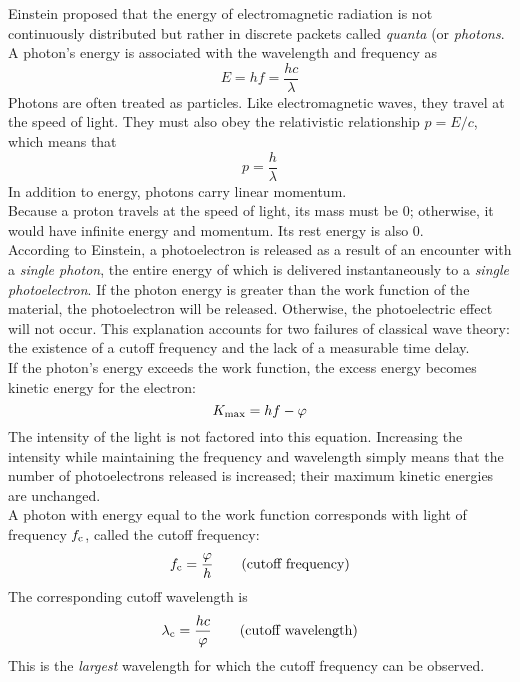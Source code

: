 \documentclass{subfiles}
\begin{document}
			Einstein proposed that the energy of electromagnetic radiation is not continuously distributed but rather in discrete packets called \textit{quanta} (or \textit{photons}. A photon's energy is associated with the wavelength and frequency as
				\[
					E = hf
						= \frac{hc}{\lambda}
						\tag{energy of a photon}
				\]
				Photons are often treated as particles. Like electromagnetic waves, they travel at the speed of light. They must also obey the relativistic relationship \(p = E/c\), which means that
				\[p = \frac{h}{\lambda}\]
				In addition to energy, photons carry linear momentum. \\
				Because a proton travels at the speed of light, its mass must be 0; otherwise, it would have infinite energy and momentum. Its rest energy is also 0. \\
			According to Einstein, a photoelectron is released as a result of an encounter with a \textit{single photon}, the entire energy of which is delivered instantaneously to a \textit{single photoelectron}. If the photon energy is greater than the work function of the material, the photoelectron will be released. Otherwise, the photoelectric effect will not occur. This explanation accounts for two failures of classical wave theory: the existence of a cutoff frequency and the lack of a measurable time delay. \\
			If the photon's energy exceeds the work function, the excess energy becomes kinetic energy for the electron:
				\[K_{\text{max}} = hf - \varphi\]
				The intensity of the light is not factored into this equation. Increasing the intensity while maintaining the frequency and wavelength simply means that the number of photoelectrons released is increased; their maximum kinetic energies are unchanged. \\
			A photon with energy equal to the work function corresponds with light of frequency \(f_{\text{c}}\), called the cutoff frequency:
				\[f_{\text{c}} = \frac{\varphi}{h} \tag{cutoff frequency}\]
				The corresponding cutoff wavelength is
				\[\lambda_{\text{c}} = \frac{hc}{\varphi} \tag{cutoff wavelength}\]
				This is the \textit{largest} wavelength for which the cutoff frequency can be observed.
\end{document}
